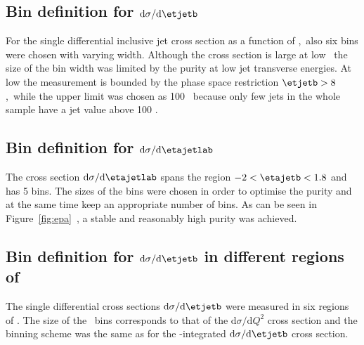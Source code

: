 \subsection*{Bin definition for ${\mathrm{d}\sigma}/{\mathrm{d}\etjetb}$}
\label{subsec:bindefet}
For the single differential inclusive jet cross section as a function of \etjetb,~also six bins were chosen with varying width. Although the cross section is large at low \etjetb~the size of the bin width was limited by the purity at low jet transverse energies. At low \etjetb the measurement is bounded by the phase space restriction $\etjetb > 8$ \GeV,~while the upper limit was chosen as 100 \GeV~because only few jets in the whole sample have a jet \etjetb value above 100 \GeV.
\subsection*{Bin definition for ${\mathrm{d}\sigma}/{\mathrm{d}\etajetlab}$}
\label{subsec:bindefeta}
The cross section ${\mathrm{d}\sigma}/{\mathrm{d}\etajetlab}$ spans the region $-2<\etajetb<1.8$ and has 5 bins. The sizes of the bins were chosen in order to optimise the purity and at the same time keep an appropriate number of bins. As can be seen in Figure~\ref{fig:epa}~, a stable and reasonably high purity was achieved.
\subsection*{Bin definition for ${\mathrm{d}\sigma}/{\mathrm{d}\etjetb}$ in different regions of \qsq}
\label{subsec:bindefetinq2}
The single differential cross sections ${\mathrm{d}\sigma}/{\mathrm{d}\etjetb}$ were measured in six regions of \qsq. The size of the \qsq~bins corresponds to that of the ${\mathrm{d}\sigma}/{\mathrm{d}Q^2}$ cross section and the \etjetb binning scheme was the same as for the \qsq-integrated ${\mathrm{d}\sigma}/{\mathrm{d}\etjetb}$ cross section.


